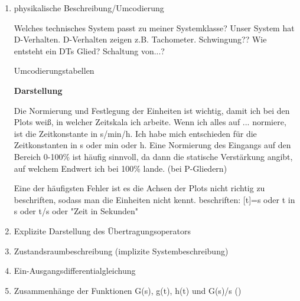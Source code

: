 \begin{enumerate}
    \item{physikalische Beschreibung/Umcodierung}

        Welches technisches System passt zu meiner Systemklasse?
        Unser System hat D-Verhalten. D-Verhalten zeigen z.B. Tachometer.
        Schwingung??
        Wie entsteht ein DTs Glied? Schaltung von...?
    
        Umcodierungstabellen

        \textbf{Darstellung}

        Die Normierung und Festlegung der Einheiten ist wichtig, damit ich bei den Plots weiß, in welcher Zeitskala ich arbeite.
        Wenn ich alles auf ... normiere, ist die Zeitkonstante in s/min/h.
        Ich habe mich entschieden für die Zeitkonstanten in s oder min oder h.
        Eine Normierung des Eingangs auf den Bereich 0-100\% ist häufig sinnvoll, da dann die statische Verstärkung angibt, auf welchem Endwert ich bei 100\% lande. (bei P-Gliedern)
        
        Eine der häufigsten Fehler ist es die Achsen der Plots nicht richtig zu beschriften, sodass man die Einheiten nicht kennt.
        beschriften: [t]=s oder t in s oder t/s oder "Zeit in Sekunden"

    \item{Explizite Darstellung des Übertragungsoperators}
    
    \item{Zustandsraumbeschreibung (implizite Systembeschreibung)}
    
    \item{Ein-Ausgangsdifferentialgleichung}

    \item{Zusammenhänge der Funktionen G(s), g(t), h(t) und G(s)/s}
        ()
        


\end{enumerate}
